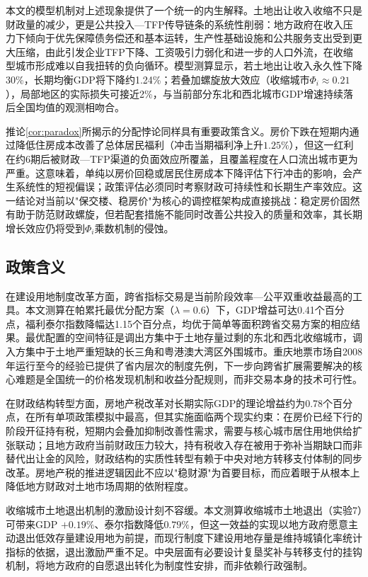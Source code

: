 \documentclass[UTF8,a4paper,12pt]{ctexart}
\theoremstyle{plain}
\theoremstyle{definition}
\theoremstyle{remark}
\begin{document}
本文的模型机制对上述现象提供了一个统一的内生解释。土地出让收入收缩不只是财政量的减少，更是公共投入—TFP传导链条的系统性削弱：地方政府在收入压力下倾向于优先保障债务偿还和基本运转，生产性基础设施和公共服务支出受到更大压缩，由此引发企业TFP下降、工资吸引力弱化和进一步的人口外流，在收缩型城市形成难以自我扭转的负向循环。模型测算显示，若土地出让收入永久性下降30\%，长期均衡GDP将下降约1.24\%；若叠加螺旋放大效应（收缩城市$\Phi_i\approx 0.21$），局部地区的实际损失可接近2\%，与当前部分东北和西北城市GDP增速持续落后全国均值的观测相吻合。

推论\ref{cor:paradox}所揭示的分配悖论同样具有重要政策含义。房价下跌在短期内通过降低住房成本改善了总体居民福利（冲击当期福利净上升$1.25\%$），但这一红利在约6期后被财政—TFP渠道的负面效应所覆盖，且覆盖程度在人口流出城市更为严重。这意味着，单纯以房价回稳或居民住房成本下降评估下行冲击的影响，会产生系统性的短视偏误；政策评估必须同时考察财政可持续性和长期生产率效应。这一结论对当前以"保交楼、稳房价"为核心的调控框架构成直接挑战：稳定房价固然有助于防范财政螺旋，但若配套措施不能同时改善公共投入的质量和效率，其长期增长效应仍将受到$\Phi_i$乘数机制的侵蚀。

\subsection{政策含义}

在建设用地制度改革方面，跨省指标交易是当前阶段效率—公平双重收益最高的工具。本文测算在帕累托最优分配方案（$\lambda=0.6$）下，GDP增益可达0.41个百分点，福利泰尔指数降幅达1.15个百分点，均优于简单等面积跨省交易方案的相应结果。最优配置的空间特征是调出方集中于土地存量过剩的东北和西北收缩城市，调入方集中于土地严重短缺的长三角和粤港澳大湾区外围城市。重庆地票市场自2008年运行至今的经验已提供了省内层次的制度先例，下一步向跨省扩展需要解决的核心难题是全国统一的价格发现机制和收益分配规则，而非交易本身的技术可行性。

在财政结构转型方面，房地产税改革对长期实际GDP的理论增益约为0.78个百分点，在所有单项政策模拟中最高，但其实施面临两个现实约束：在房价已经下行的阶段开征持有税，短期内会叠加抑制改善性需求，需要与核心城市居住用地供给扩张联动；且地方政府当前财政压力较大，持有税收入存在被用于弥补当期缺口而非替代出让金的风险，财政结构的实质性转型有赖于中央对地方转移支付体制的同步改革。房地产税的推进逻辑因此不应以"稳财源"为首要目标，而应着眼于从根本上降低地方财政对土地市场周期的依附程度。

收缩城市土地退出机制的激励设计刻不容缓。本文测算收缩城市土地退出（实验7）可带来GDP $+0.19\%$、泰尔指数降低$0.79\%$，但这一效益的实现以地方政府愿意主动退出低效存量建设用地为前提，而现行制度下建设用地存量是维持城镇化率统计指标的依据，退出激励严重不足。中央层面有必要设计复垦奖补与转移支付的挂钩机制，将地方政府的自愿退出转化为制度性安排，而非依赖行政强制。
\end{document}
